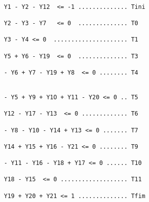 \begin{verbatim}

Y1 - Y2 - Y12  <= -1 .............. Tini 

Y2 - Y3 - Y7   <= 0  .............. T0

Y3 - Y4 <= 0  ..................... T1

Y5 + Y6 - Y19  <= 0  .............. T3

- Y6 + Y7 - Y19 + Y8  <= 0 ........ T4


- Y5 + Y9 + Y1O + Y11 - Y20 <= 0 .. T5

Y12 - Y17 - Y13  <= 0 ............. T6

- Y8 - Y10 - Y14 + Y13 <= 0 ....... T7

Y14 + Y15 + Y16 - Y21 <= 0 ........ T9

- Y11 - Y16 - Y18 + Y17 <= 0 ...... T10

Y18 - Y15  <= 0 ................... T11

Y19 + Y20 + Y21 <= 1 .............. Tfim

\end{verbatim}





